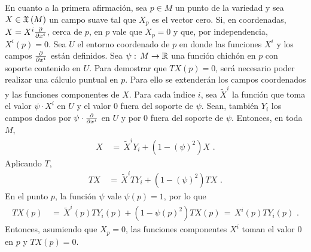 \begin{obsUnoFormasYCampos}
	En cuanto a la primera afirmaci\'{o}n, sea $p\in M$ un punto
	de la variedad y sea $X\in\mathfrak{X}\left(M\right)$ un campo suave tal que $X_{p}$
	es el vector cero. Si, en coordenadas, $X = X^{i}\gancho{x^{i}}$,
	cerca de $p$, en $p$ vale que $X_{p}=0$ y que, por independencia,
	$X^{i}(p)=0$. Sea $U$ el entorno coordenado de $p$ en donde las
	funciones $X^{i}$ y los campos $\gancho{x^{i}}$ est\'{a}n definidos.
	Sea $\psi:\,M\rightarrow\mathbb{R}$ una funci\'{o}n chich\'{o}n en $p$
	con soporte contenido en $U$. Para demostrar que $TX(p)=0$, ser\'{a}
	necesario poder realizar una c\'{a}lculo puntual en $p$. Para
	ello se extender\'{a}n los campos coordenados y las funciones
	componentes de $X$. Para cada \'{\i}ndice $i$, sea $\tilde{X}^{i}$
	la funci\'{o}n que toma el valor $\psi\cdot X^{i}$ en $U$ y el valor
	$0$ fuera del soporte de $\psi$. Sean, tambi\'{e}n $Y_{i}$ los campos
	dados por $\psi\cdot\gancho{x^{i}}$ en $U$ y por $0$ fuera del
	soporte de $\psi$. Entonces, en toda $M$,
	\begin{align*}
		X & \,=\, \tilde{X}^{i}Y_{i} + (1-(\psi)^{2})X
		\text{ .}
	\end{align*}
	Aplicando $T$,
	\begin{align*}
		TX & \,=\, \tilde{X}^{i}TY_{i} + (1-(\psi)^{2})TX
		\text{ .}
	\end{align*}
	En el punto $p$, la funci\'{o}n $\psi$ vale $\psi(p)=1$, por lo que
	\begin{align*}
		TX(p) & \,=\,\tilde{X}^{i}(p)TY_{i}(p) +
			(1-\psi(p)^{2})TX(p) \,=\,
			X^{i}(p)TY_{i}(p)
		\text{ .}
	\end{align*}
	Entonces, asumiendo que $X_{p}=0$, las funciones componentes
	$X^{i}$ toman el valor $0$ en $p$ y $TX(p)=0$.


\end{obsUnoFormasYCampos}
